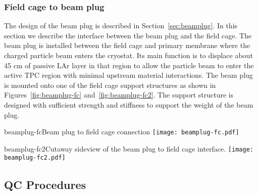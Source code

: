 \subsubsection{Field cage to beam plug}
\label{subsec:fc-beamplug}
The design of the beam plug is described in Section~\ref{sec:beamplug}. In this section we describe the interface between the beam plug and the field cage. The beam plug is installed between the field cage and primary membrane where the charged particle beam enters the cryostat. Its main function is to displace about 45 cm of passive LAr layer in that region to allow the particle beam to enter the active TPC region with minimal upstream material interactions. The beam plug is mounted onto one of the field cage support structures as shown in Figures~\ref{fig:beamplug-fc} and~\ref{fig:beamplug-fc2}. The support structure is designed with sufficient  strength and stiffness to support the weight of the beam plug.
\begin{cdrfigure}{beamplug-fc}{Beam plug to field cage connection}
\texttt{[image: beamplug-fc.pdf]}
\end{cdrfigure}
\begin{cdrfigure}{beamplug-fc2}{Cutaway sideview of the beam plug to field cage interface.}
\texttt{[image: beamplug-fc2.pdf]}
\end{cdrfigure}






\subsection{QC Procedures}

